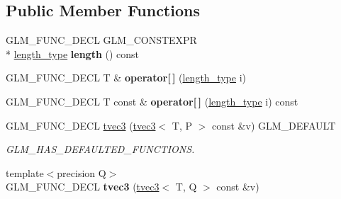 \subsection*{Public Member Functions}
\begin{DoxyCompactItemize}
\item 
\hypertarget{structglm_1_1tvec3_a6ad4966f9e382e68daf764d847af4355}{G\-L\-M\-\_\-\-F\-U\-N\-C\-\_\-\-D\-E\-C\-L G\-L\-M\-\_\-\-C\-O\-N\-S\-T\-E\-X\-P\-R \\*
\hyperlink{structglm_1_1tvec3_a3a79c6a1cfc9fb8821a0a878fa2de91a}{length\-\_\-type} {\bfseries length} () const }\label{structglm_1_1tvec3_a6ad4966f9e382e68daf764d847af4355}

\item 
\hypertarget{structglm_1_1tvec3_ae58fbe8fe435bdd4c928aa08442e7284}{G\-L\-M\-\_\-\-F\-U\-N\-C\-\_\-\-D\-E\-C\-L T \& {\bfseries operator\mbox{[}$\,$\mbox{]}} (\hyperlink{structglm_1_1tvec3_a3a79c6a1cfc9fb8821a0a878fa2de91a}{length\-\_\-type} i)}\label{structglm_1_1tvec3_ae58fbe8fe435bdd4c928aa08442e7284}

\item 
\hypertarget{structglm_1_1tvec3_ae95f5d26f0b9943037ebc580e4b60b7a}{G\-L\-M\-\_\-\-F\-U\-N\-C\-\_\-\-D\-E\-C\-L T const \& {\bfseries operator\mbox{[}$\,$\mbox{]}} (\hyperlink{structglm_1_1tvec3_a3a79c6a1cfc9fb8821a0a878fa2de91a}{length\-\_\-type} i) const }\label{structglm_1_1tvec3_ae95f5d26f0b9943037ebc580e4b60b7a}

\item 
\hypertarget{structglm_1_1tvec3_ab99c41be5972d7013d2cc5c7e4a5a6fd}{G\-L\-M\-\_\-\-F\-U\-N\-C\-\_\-\-D\-E\-C\-L \hyperlink{structglm_1_1tvec3_ab99c41be5972d7013d2cc5c7e4a5a6fd}{tvec3} (\hyperlink{structglm_1_1tvec3}{tvec3}$<$ T, P $>$ const \&v) G\-L\-M\-\_\-\-D\-E\-F\-A\-U\-L\-T}\label{structglm_1_1tvec3_ab99c41be5972d7013d2cc5c7e4a5a6fd}

\begin{DoxyCompactList}\small\item\em G\-L\-M\-\_\-\-H\-A\-S\-\_\-\-D\-E\-F\-A\-U\-L\-T\-E\-D\-\_\-\-F\-U\-N\-C\-T\-I\-O\-N\-S. \end{DoxyCompactList}\item 
\hypertarget{structglm_1_1tvec3_aefd460bd84e63834a84908b9271bc5fb}{{\footnotesize template$<$precision Q$>$ }\\G\-L\-M\-\_\-\-F\-U\-N\-C\-\_\-\-D\-E\-C\-L {\bfseries tvec3} (\hyperlink{structglm_1_1tvec3}{tvec3}$<$ T, Q $>$ const \&v)}\label{structglm_1_1tvec3_aefd460bd84e63834a84908b9271bc5fb}


\end{DoxyCompactItemize}
